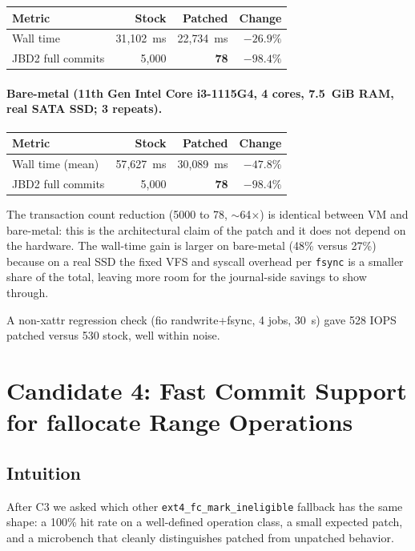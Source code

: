 \documentclass[11pt,a4paper]{article}
\begin{document}
\begin{center}
\begin{tabular}{lrrr}
\toprule
Metric & Stock & Patched & Change \\
\midrule
Wall time         & 31{,}102~ms & 22{,}734~ms & $-26.9\%$ \\
JBD2 full commits & 5{,}000 & \textbf{78} & $\mathbf{-98.4\%}$ \\
\bottomrule
\end{tabular}
\end{center}

\paragraph{Bare-metal (11th Gen Intel Core i3-1115G4, 4
cores, 7.5~GiB RAM, real SATA SSD; 3 repeats).}

\begin{center}
\begin{tabular}{lrrr}
\toprule
Metric & Stock & Patched & Change \\
\midrule
Wall time (mean)  & 57{,}627~ms & 30{,}089~ms & $-47.8\%$ \\
JBD2 full commits & 5{,}000 & \textbf{78} & $\mathbf{-98.4\%}$ \\
\bottomrule
\end{tabular}
\end{center}

The transaction count reduction (5000 to 78, $\sim$64$\times$) is
identical between VM and bare-metal: this is the architectural
claim of the patch and it does not depend on the hardware. The
wall-time gain is larger on bare-metal (48\% versus 27\%) because
on a real SSD the fixed VFS and syscall overhead per
\texttt{fsync} is a smaller share of the total, leaving more room
for the journal-side savings to show through.

A non-xattr regression check (fio randwrite+fsync, 4 jobs, 30~s)
gave 528 IOPS patched versus 530 stock, well within noise.

\section{Candidate 4: Fast Commit Support for fallocate Range Operations}

\subsection{Intuition}

After C3 we asked which other \texttt{ext4\_fc\_mark\_ineligible}
fallback has the same shape: a 100\% hit rate on a well-defined
operation class, a small expected patch, and a microbench that
cleanly distinguishes patched from unpatched behavior.
\end{document}

